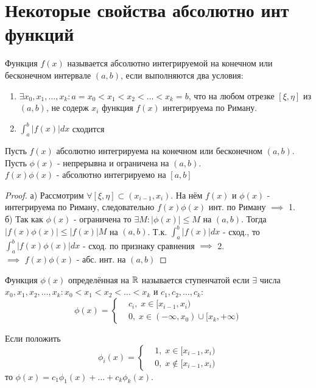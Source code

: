 \documentclass{article}
\begin{document}
\section{Некоторые свойства абсолютно инт функций}
\begin{definition}
  Функция $f(x)$ называется абсолютно интегрируемой на конечном или бесконечном интервале $(a,b)$,
  если выполняются два условия:
  \begin{enumerate}
    \item $\exists x_0,x_1,\dots,x_k:a=x_0<x_1<x_2<\dots<x_k=b$, что на любом отрезке
      $[\xi,\eta]$ из $(a,b)$, не содерж $x_i$ функция $f(x)$ интегрируема по Риману.
    \item $\int_{a}^{b}|f(x)|dx$ сходится
  \end{enumerate}
\end{definition}
\begin{lemma} \label{l1_abs_prod}
 Пусть $f(x)$ абсолютно интегрируема на конечном или бесконечном $(a,b)$.
 Пусть $\phi(x)$ - непрерывна и ограничена на $(a,b)$. \\
 $f(x)\phi(x)$ - абсолютно интегрируемо на $[a,b]$
\end{lemma}
\begin{proof}
  а) Рассмотрим $\forall [\xi,\eta]\subset(x_{i-1},x_i)$. На нём $f(x)$ и $\phi(x)$ - интегрируема
  по Риману, следовательно $f(x)\phi(x)$ инт. по Риману $\implies$ 1. \\
  б) Так как $\phi(x)$ - ограничена то $\exists M:|\phi(x)|\le M$ на $(a,b)$.
  Тогда $|f(x)\phi(x)|\le|f(x)|M$ на $(a,b)$. Т.к. $\int_{a}^{b}|f(x)|dx$ - сход.,
  то $\int_{a}^{b}|f(x)\phi(x)|dx$ - сход. по признаку сравнения $\implies$ 2. \\
  $\implies$ $f(x)\phi(x)$ - абс. инт. на $(a,b)$
\end{proof}
\begin{definition}
  Функция $\phi(x)$ определённая на $\mathbb{R}$ называется ступенчатой если
  $\exists$ числа $x_0,x_1,x_2,\dots,x_k:x_0<x_1<x_2<\dots<x_k$ и
  $c_1,c_2,\dots,c_k$:
  \[
    \phi(x) = \left\{\begin{aligned}
      & c_i, \; x \in [x_{i-1},x_i) \\ 
      & 0, \; x \in (-\infty,x_0) \cup [x_k,+\infty)
    \end{aligned}\right.
  \]
\end{definition}
\begin{remark}
  Если положить
  \[
    \phi_i(x) = \left\{\begin{aligned}
      & 1, \; x \in [x_{i-1}, x_i) \\ 
      & 0, \; x \notin [x_{i-1}, x_i)
    \end{aligned}\right.
  \]
  то $\phi(x)=c_1\phi_1(x)+\dots+c_k\phi_k(x)$.
\end{remark}
\end{document}
